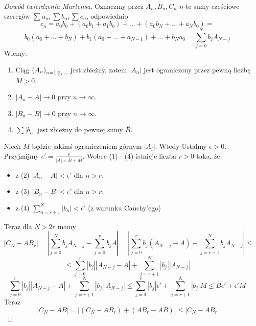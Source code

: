 \documentclass[9pt]{article}
\begin{document}
\begin{proof}[Dowód twierdzenia Martensa]
    Oznaczmy przez $A_n, B_n, C_n$ $n$-te sumy częściowe szeregów $\sum a_n, \sum b_n, \sum c_n$,
    odpowiednio
    \[
        c_n = a_0 b_0 + (a_0 b_1 + a_1 b_0) + ...  + (a_0 b_N + ... + a_N b_0) =
    \]
    \[
        b_0 (a_0 + ... + b_N) + b_1 (a_0 + ... + a_{N-1}) + ... + b_N a_0 = 
        \sum_{j = 0}^N b_j A_{N-j}
    \]
    Wiemy:
    \begin{enumerate}
        \item Ciąg $\left(A_n\right)_{n = 1,2,...}$ jest zbieżny, zatem $\left|A_n\right|$ jest ograniczony przez pewną
            liczbę $M > 0$.
        \item $\left|A_n - A\right| \to 0$ przy $n \to \infty$.
        \item $\left|B_n - B\right| \to 0$ przy $n \to \infty$.
        \item $\sum \left|b_n\right|$ jest zbieżny do pewnej sumy $\overline{B}$.
    \end{enumerate}
    Niech $M$ będzie jakimś ograniczeniem górnym $\left|A_i\right|$. Wtedy
    Ustalmy $\epsilon > 0$. Przyjmijmy $\epsilon' = \frac{\epsilon}{|A| + \overline{B} + M}$.
    Wobec (1) - (4) istnieje liczba $r > 0$
    taka, że
    \begin{itemize}
        \item z (2) $\left|A_n - A\right| < \epsilon'$ dla $n > r$.
        \item z (3) $\left|B_n - B\right| < \epsilon'$ dla $n > r$.
        \item z (4) $\sum_{n =r+1}^N \left|b_n\right| < \epsilon'$ (z warunku Cauchy'ego)
    \end{itemize}
    Teraz dla $N > 2r$ mamy
    \[
    \left|C_N - A B_r\right| = \left|\sum_{j = 0}^N b_j A_{N-j} - \sum_{j = 0}^r b_j A\right|
    =\left|\sum_{j = 0}^r b_j (A_{N-j} - A) + \sum_{j = r+1}^N b_j A_{N-j}\right| \le
    \]
    \[
        \le
        \sum_{j = 0}^r \left|b_j\right| \left|A_{N-j} - A\right|
        +
        \sum_{j = r+1}^N \left|b_j\right| \left|A_{N-j}\right|
    \]
    \[
        \sum_{j = 0}^r \left|b_j\right| \left|A_{N-j} - A\right|
        +
        \sum_{j = r+1}^N \left|b_j\right| \left|A_{N-j}\right|
        \le
        \sum_{j = 0}^r \left|b_j\right| \epsilon'
        +
        \sum_{j = r+1}^N \left|b_j\right| M
        \le
        \overline{B} \epsilon' + \epsilon' M
    \]
    Teraz
    \[
        \left|C_N - AB\right| =
        \left|
            (C_N - A B_r) + (A B_r - AB)
        \right|
        \le
        \left|
            C_N - A B_r
\]
\end{proof}
\end{document}
